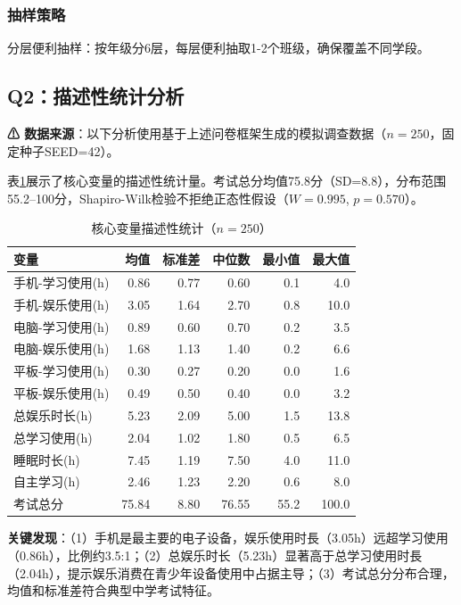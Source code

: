 \documentclass[11pt]{ctexart}
\begin{document}
\subsubsection{抽样策略}

分层便利抽样：按年级分6层，每层便利抽取1-2个班级，确保覆盖不同学段。

\subsection{Q2：描述性统计分析}

\textbf{⚠ 数据来源}：以下分析使用基于上述问卷框架生成的模拟调查数据（$n=250$，固定种子SEED=42）。

表\ref{tab:desc}展示了核心变量的描述性统计量。考试总分均值75.8分（SD=8.8），分布范围55.2--100分，Shapiro-Wilk检验不拒绝正态性假设（$W=0.995$, $p=0.570$）。

\begin{table}[H]
\centering
\caption{核心变量描述性统计（$n=250$）}
\label{tab:desc}
\begin{tabular}{lrrrrr}
\toprule
变量 & 均值 & 标准差 & 中位数 & 最小值 & 最大值 \\
\midrule
手机-学习使用(h) & 0.86 & 0.77 & 0.60 & 0.1 & 4.0 \\
手机-娱乐使用(h) & 3.05 & 1.64 & 2.70 & 0.8 & 10.0 \\
电脑-学习使用(h) & 0.89 & 0.60 & 0.70 & 0.2 & 3.5 \\
电脑-娱乐使用(h) & 1.68 & 1.13 & 1.40 & 0.2 & 6.6 \\
平板-学习使用(h) & 0.30 & 0.27 & 0.20 & 0.0 & 1.6 \\
平板-娱乐使用(h) & 0.49 & 0.50 & 0.40 & 0.0 & 3.2 \\
总娱乐时长(h) & 5.23 & 2.09 & 5.00 & 1.5 & 13.8 \\
总学习使用(h) & 2.04 & 1.02 & 1.80 & 0.5 & 6.5 \\
睡眠时长(h) & 7.45 & 1.19 & 7.50 & 4.0 & 11.0 \\
自主学习(h) & 2.46 & 1.23 & 2.20 & 0.6 & 8.0 \\
考试总分 & 75.84 & 8.80 & 76.55 & 55.2 & 100.0 \\
\bottomrule
\end{tabular}
\end{table}

\textbf{关键发现}：（1）手机是最主要的电子设备，娱乐使用时長（3.05h）远超学习使用（0.86h），比例约3.5:1；（2）总娱乐时长（5.23h）显著高于总学习使用时長（2.04h），提示娱乐消费在青少年设备使用中占据主导；（3）考试总分分布合理，均值和标准差符合典型中学考试特征。
\end{document}
